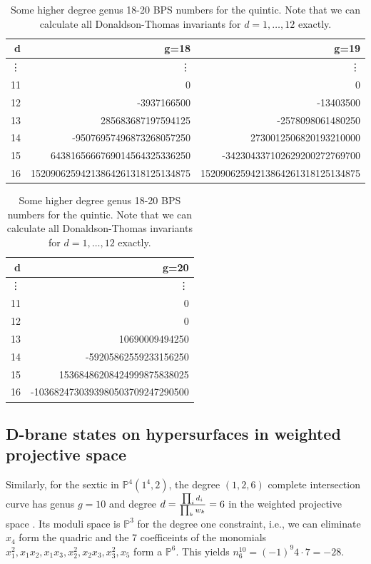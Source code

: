 \documentclass[12pt]{article}
\begin{document}
\begin{table}
\begin{centering}
\begin{tabular}{|r|rr|}
\hline
d &g=18 &g=19\\
\hline
\vdots& \vdots   &   \vdots \\
11& 0 &  0  \\
12&-3937166500  & -13403500  \\
13& 285683687197594125   &   -2578098061480250            \\
14&  -95076957496873268057250  &    2730012506820193210000            \\
15&  6438165666769014564325336250  &            -342304337102629200272769700   \\
16&  15209062594213864261318125134875  &    15209062594213864261318125134875           \\
\hline
\end{tabular}

\begin{tabular}{|r|r|}
\hline
d &g=20 \\
\hline
\vdots& \vdots \\
11& 0 \\
12& 0 \\
13& 10690009494250 \\
14& -59205862559233156250 \\
15& 15368486208424999875838025 \\
16& -1036824730393980503709247290500 \\
\hline
\end{tabular}
\caption{Some higher degree genus 18-20 BPS numbers for the quintic. Note
that we can calculate all Donaldson-Thomas invariants for $d=1,\ldots,12$
exactly.}
\end{centering}
\end{table}

\subsection{D-brane states on hypersurfaces in weighted projective space}

Similarly, for the sextic in $\mathbb{P}^4(1^4,2)$, the degree
$(1,2,6)$ complete intersection curve has genus $g=10$ and degree
$d={\prod_i d_i\over \prod_k w_k}=6$ in the weighted projective
space . Its moduli space is $\mathbb{P}^3$ for the degree one
constraint, i.e., we can eliminate $x_4$ form the quadric and the 7
coefficeints of the monomials $x_1^2, x_1x_2, x_1x_3, x_2^2, x_2
x_3 ,x_3^2,x_5$ form a $\mathbb{P}^6$. This yields
$n^{10}_6=(-1)^9 4 \cdot 7=-28$.
\end{document}
